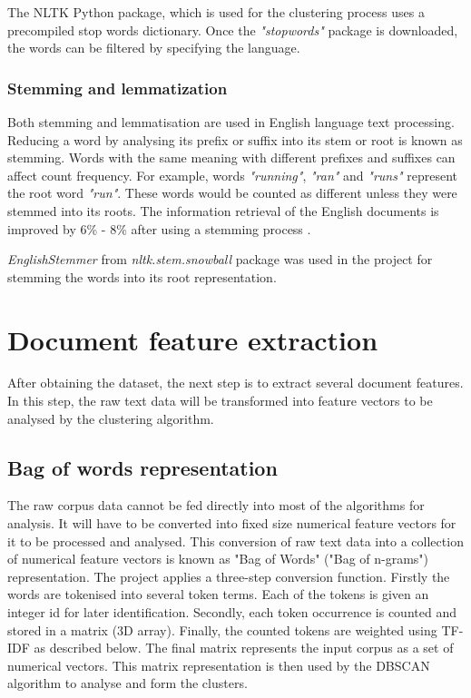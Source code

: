 \documentclass[conference]{IEEEtran}
\begin{document}
The NLTK Python package, which is used for the clustering process uses a precompiled stop words dictionary. Once the \textit{"stopwords"} package is downloaded, the words can be filtered by specifying the language. 

\subsubsection{Stemming and lemmatization}

Both stemming and lemmatisation are used in English language text processing. Reducing a word by analysing its prefix or suffix into its stem or root is known as stemming. Words with the same meaning with different prefixes and suffixes can affect count frequency. For example, words \textit{"running"}, \textit{"ran"} and \textit{"runs"} represent the root word \textit{"run"}. These words would be counted as different unless they were stemmed into its roots. The information retrieval of the English documents is improved by 6\% - 8\% after using a stemming process \cite{6272740}. 

\textit{EnglishStemmer} from \textit{nltk.stem.snowball} package was used in the project for stemming the words into its root representation. 

\section{Document feature extraction}

After obtaining the dataset, the next step is to extract several document features. In this step, the raw text data will be transformed into feature vectors to be analysed by the clustering algorithm. 

\subsection{Bag of words representation}

The raw corpus data cannot be fed directly into most of the algorithms for analysis. It will have to be converted into fixed size numerical feature vectors for it to be processed and analysed. This conversion of raw text data into a collection of numerical feature vectors is known as "Bag of Words" ("Bag of n-grams") representation. The project applies a three-step conversion function. Firstly the words are tokenised into several token terms. Each of the tokens is given an integer id for later identification. Secondly, each token occurrence is counted and stored in a matrix (3D array). Finally, the counted tokens are weighted using TF-IDF as described below. The final matrix represents the input corpus as a set of numerical vectors. This matrix representation is then used by the DBSCAN algorithm to analyse and form the clusters. \cite{scikit-learn}
\end{document}
